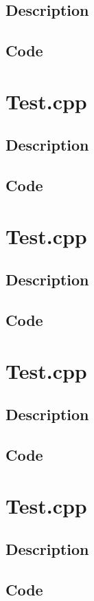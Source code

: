         \subsection{Description}
        \subsection{Code}
    \section{Test.cpp}
        \subsection{Description}
        \subsection{Code}
    \section{Test.cpp}
        \subsection{Description}
        \subsection{Code}
    \section{Test.cpp}
        \subsection{Description}
        \subsection{Code}
    \section{Test.cpp}
        \subsection{Description}
        \subsection{Code}
